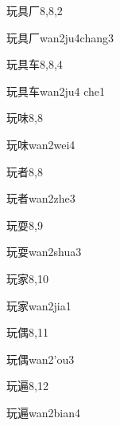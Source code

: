 \begin{entry}{玩具厂}{8,8,2}
  \begin{phonetics}{玩具厂}{wan2ju4chang3}
  \end{phonetics}
\end{entry}

\begin{entry}{玩具车}{8,8,4}
  \begin{phonetics}{玩具车}{wan2ju4 che1}
  \end{phonetics}
\end{entry}

\begin{entry}{玩味}{8,8}
  \begin{phonetics}{玩味}{wan2wei4}
  \end{phonetics}
\end{entry}

\begin{entry}{玩者}{8,8}
  \begin{phonetics}{玩者}{wan2zhe3}
  \end{phonetics}
\end{entry}

\begin{entry}{玩耍}{8,9}
  \begin{phonetics}{玩耍}{wan2shua3}
  \end{phonetics}
\end{entry}

\begin{entry}{玩家}{8,10}
  \begin{phonetics}{玩家}{wan2jia1}
  \end{phonetics}
\end{entry}

\begin{entry}{玩偶}{8,11}
  \begin{phonetics}{玩偶}{wan2'ou3}
  \end{phonetics}
\end{entry}

\begin{entry}{玩遍}{8,12}
  \begin{phonetics}{玩遍}{wan2bian4}
  \end{phonetics}
\end{entry}

